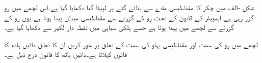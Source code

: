
شکل -الف میں  چکر کا  مقناطیسی مادے سے بنائے گئے  پر لپیٹا گیا  دکھایا گیا ہے۔اس لچھے میں  رو گزر رہی ہے۔ایمپیئر کے قانون کے تحت رو کے گزرنے سے مقناطیسی میدان پیدا ہوتا ہے۔یوں رو کے گزرنے سے لچھے میں   پیدا ہوتا ہے جسے ہلکی سیاہی میں نقطہ دار لکیر سے دکھایا گیا ہے۔

لچھے میں رو کی سمت اور مقناطیسی بہاو کی سمت کے تعلق پر غور کریں۔ان کا تعلق دائیں ہاتھ کا قانون کہلاتا ہے۔دائیں ہاتھ کا قانون درج ذیل ہے۔

